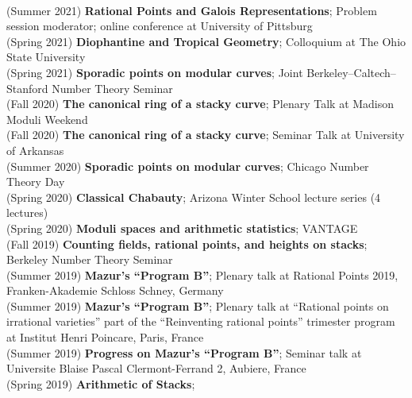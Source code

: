 \documentclass[margin,line]{res}
\begin{document}
\begin{resume}
\vspace{.05cm}\\
(Summer 2021) \textbf{Rational Points and Galois Representations};
Problem session moderator; online conference at University of Pittsburg
\vspace{.05cm}\\
(Spring 2021) \textbf{Diophantine and Tropical Geometry};
Colloquium at The Ohio State University 
\vspace{.05cm}\\
(Spring 2021) \textbf{Sporadic points on modular curves};
Joint Berkeley--Caltech--Stanford Number Theory Seminar
\vspace{.05cm}\\
(Fall 2020) \textbf{The canonical ring of a stacky curve};  
Plenary Talk at Madison Moduli Weekend 
\vspace{.05cm}\\
(Fall 2020) \textbf{The canonical ring of a stacky curve};  
Seminar Talk at University of Arkansas
\vspace{.05cm}\\
(Summer 2020) \textbf{Sporadic points on modular curves};
Chicago Number Theory Day 
\vspace{.05cm}\\
(Spring 2020) \textbf{Classical Chabauty};
Arizona Winter School lecture series (4 lectures)
\vspace{.05cm}\\
(Spring 2020) \textbf{Moduli spaces and arithmetic statistics};
VANTAGE
\vspace{.05cm}\\
(Fall 2019) \textbf{Counting fields, rational points, and heights on stacks};
Berkeley Number Theory Seminar
\vspace{.05cm}\\
(Summer 2019) \textbf{Mazur's ``Program B''};  
Plenary talk at Rational Points 2019, Franken-Akademie Schloss Schney, Germany
\vspace{.05cm}\\
(Summer 2019) \textbf{Mazur's ``Program B''};  
Plenary talk at ``Rational points on irrational varieties'' part of the  ``Reinventing rational points'' trimester program at Institut Henri Poincare, Paris, France
\\
(Summer 2019) \textbf{Progress on Mazur's ``Program B''};  
Seminar talk at Universite Blaise Pascal Clermont-Ferrand 2, Aubiere, France
\vspace{.05cm}\\
(Spring 2019) \textbf{Arithmetic of Stacks};  

\end{resume}
\end{document}
